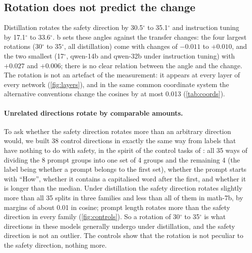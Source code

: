 \documentclass[10pt]{article}
\begin{document}
\subsection{Rotation does not predict the change}
\label{sec:rotation}

Distillation rotates the safety direction by 30.5$^\circ$ to 35.1$^\circ$ and instruction tuning by 17.1$^\circ$ to 33.6$^\circ$. b sets these angles against the transfer changes: the four largest rotations (30$^\circ$ to 35$^\circ$, all distillation) come with changes of $-0.011$ to $+0.010$, and the two smallest (17$^\circ$, qwen-14b and qwen-32b under instruction tuning) with $+0.027$ and $+0.006$; there is no clear relation between the angle and the change. The rotation is not an artefact of the measurement: it appears at every layer of every network (\cref{fig:layers}), and in the same common coordinate system the alternative conventions change the cosines by at most 0.013 (\cref{tab:coords}).

\paragraph{Unrelated directions rotate by comparable amounts.} To ask whether the safety direction rotates more than an arbitrary direction would, we built 38 control directions in exactly the same way from labels that have nothing to do with safety, in the spirit of the control tasks of \citet{hewitt2019}: all 35 ways of dividing the 8 prompt groups into one set of 4 groups and the remaining 4 (the label being whether a prompt belongs to the first set), whether the prompt starts with ``How'', whether it contains a capitalised word after the first, and whether it is longer than the median. Under distillation the safety direction rotates slightly more than all 35 splits in three families and less than all of them in math-7b, by margins of about 0.01 in cosine; prompt length rotates more than the safety direction in every family (\cref{fig:controls}). So a rotation of 30$^\circ$ to 35$^\circ$ is what directions in these models generally undergo under distillation, and the safety direction is not an outlier. The controls show that the rotation is not peculiar to the safety direction, nothing more.
\end{document}

